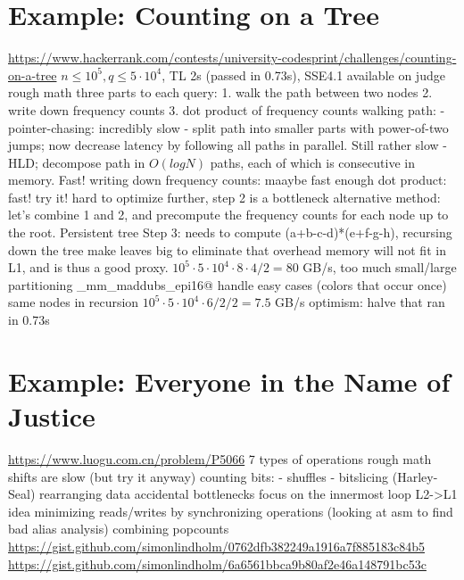 \documentclass[openany]{book}
\begin{document}
\chapter{Example: Counting on a Tree}
\url{https://www.hackerrank.com/contests/university-codesprint/challenges/counting-on-a-tree}
$n \le 10^5, q \le 5\cdot 10^4$, TL 2s (passed in 0.73s), SSE4.1 available on judge
rough math
three parts to each query:
1. walk the path between two nodes
2. write down frequency counts
3. dot product of frequency counts
walking path:
- pointer-chasing: incredibly slow
- split path into smaller parts with power-of-two jumps; now decrease latency by following all paths in parallel. Still rather slow
- HLD; decompose path in $O(log N)$ paths, each of which is consecutive in memory. Fast!
writing down frequency counts: maaybe fast enough
dot product: fast!
try it! hard to optimize further, step 2 is a bottleneck
alternative method: let's combine 1 and 2, and precompute the frequency counts for each node up to the root. Persistent tree
Step 3: needs to compute (a+b-c-d)*(e+f-g-h), recursing down the tree
make leaves big to eliminate that overhead
memory will not fit in L1, and is thus a good proxy. $10^5 \cdot 5\cdot 10^4 \cdot 8 \cdot 4 / 2 = 80$ GB/s, too much
small/large partitioning
\verb@_mm_maddubs_epi16@
handle easy cases (colors that occur once)
same nodes in recursion
$10^5 \cdot 5\cdot 10^4 \cdot 6 / 2 / 2 = 7.5$ GB/s
optimism: halve that
ran in 0.73s

\chapter{Example: Everyone in the Name of Justice}
\url{https://www.luogu.com.cn/problem/P5066}
7 types of operations
rough math
shifts are slow (but try it anyway)
counting bits:
- shuffles
- bitslicing (Harley-Seal)
rearranging data
accidental bottlenecks
focus on the innermost loop
L2->L1 idea
minimizing reads/writes by synchronizing operations
(looking at asm to find bad alias analysis)
combining popcounts
\url{https://gist.github.com/simonlindholm/0762dfb382249a1916a7f885183c84b5}
\url{https://gist.github.com/simonlindholm/6a6561bbca9b80af2e46a148791bc53c}
\end{document}
